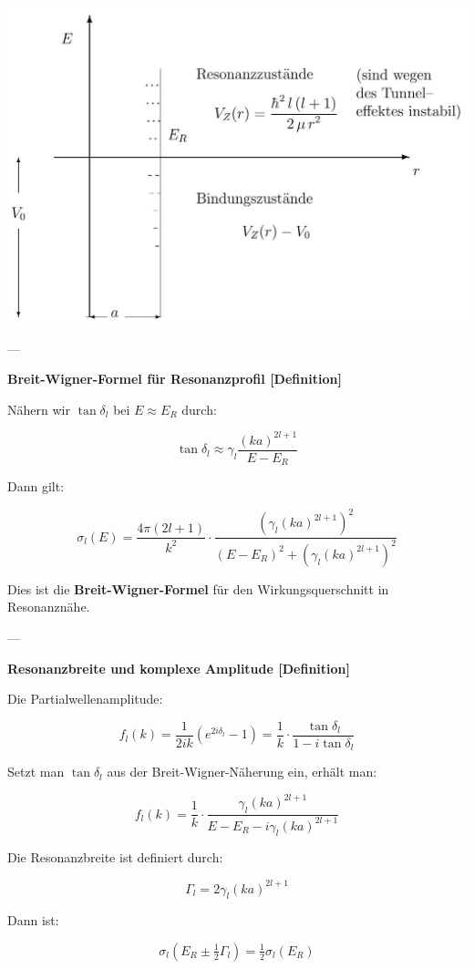\documentclass[10pt, letterpaper]{article}
\begin{document}
\begin{center}
\includegraphics[scale=0.2]{2025_05_21_d5590f158a899e385c7cg-21}
\end{center}

---

\textbf{Breit-Wigner-Formel für Resonanzprofil [Definition]}

Nähern wir $\tan \delta_l$ bei $E \approx E_R$ durch:

\[
\tan \delta_l \approx \gamma_l \frac{(ka)^{2l+1}}{E - E_R}
\]

Dann gilt:

\[
\sigma_l(E) = \frac{4\pi(2l+1)}{k^2} \cdot \frac{(\gamma_l(ka)^{2l+1})^2}{(E - E_R)^2 + (\gamma_l(ka)^{2l+1})^2}
\]

Dies ist die \textbf{Breit-Wigner-Formel} für den Wirkungsquerschnitt in Resonanznähe.

---

\textbf{Resonanzbreite und komplexe Amplitude [Definition]}

Die Partialwellenamplitude:

\[
f_l(k) = \frac{1}{2ik} (e^{2i\delta_l} - 1) =
\frac{1}{k} \cdot \frac{\tan \delta_l}{1 - i \tan \delta_l}
\]

Setzt man $\tan \delta_l$ aus der Breit-Wigner-Näherung ein, erhält man:

\[
f_l(k) = \frac{1}{k} \cdot \frac{\gamma_l (ka)^{2l+1}}{E - E_R - i \gamma_l (ka)^{2l+1}}
\]

Die Resonanzbreite ist definiert durch:

\[
\Gamma_l = 2 \gamma_l (ka)^{2l+1}
\]

Dann ist:

\[
\sigma_l(E_R \pm \tfrac{1}{2} \Gamma_l) = \tfrac{1}{2} \sigma_l(E_R)
\]
\end{document}
